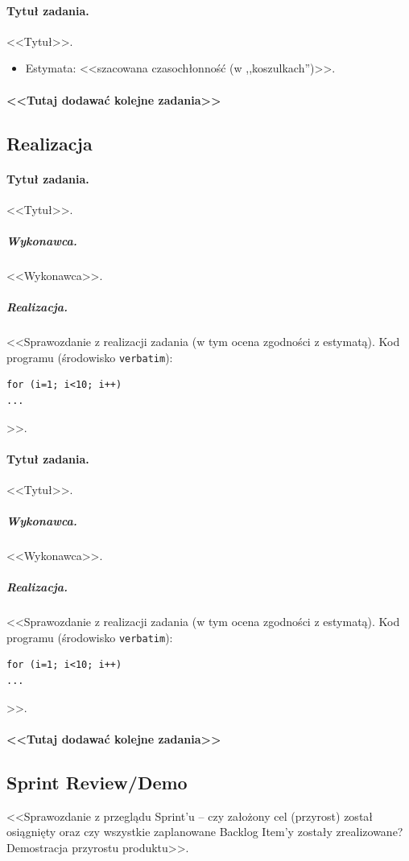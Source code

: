 \documentclass[a4paper]{article}
\begin{document}
\paragraph{Tytuł zadania.} <<Tytuł>>.
\begin{itemize}
\item Estymata: <<szacowana czasochłonność (w ,,koszulkach'')>>.
\end{itemize}

\paragraph{<<Tutaj dodawać kolejne zadania>>}

\subsection{Realizacja}

\paragraph{Tytuł zadania.} <<Tytuł>>.
\subparagraph{Wykonawca.} <<Wykonawca>>.
\subparagraph{Realizacja.} <<Sprawozdanie z realizacji zadania (w tym ocena zgodności z estymatą). Kod programu (środowisko \texttt{verbatim}): \begin{verbatim}
for (i=1; i<10; i++)
...
\end{verbatim}>>.

\paragraph{Tytuł zadania.} <<Tytuł>>.
\subparagraph{Wykonawca.} <<Wykonawca>>.
\subparagraph{Realizacja.} <<Sprawozdanie z realizacji zadania (w tym ocena zgodności z estymatą). Kod programu (środowisko \texttt{verbatim}): \begin{verbatim}
for (i=1; i<10; i++)
...
\end{verbatim}>>.

\paragraph{<<Tutaj dodawać kolejne zadania>>}


\subsection{Sprint Review/Demo}
<<Sprawozdanie z przeglądu Sprint'u -- czy założony cel (przyrost) został osiągnięty oraz czy wszystkie zaplanowane Backlog Item'y zostały zrealizowane? Demostracja przyrostu produktu>>.
\end{document}
